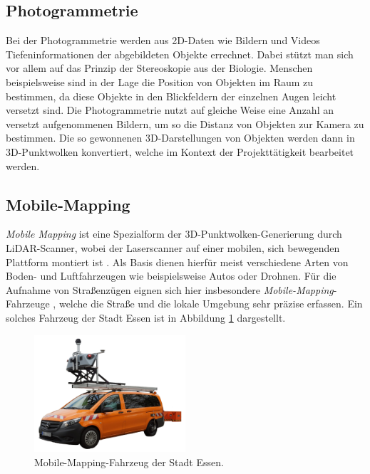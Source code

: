 \subsection*{Photogrammetrie}
Bei der Photogrammetrie \citep{Linder-2009, Remondino.ElHakim-2006} werden aus 2D-Daten wie Bildern und Videos Tiefeninformationen der abgebildeten Objekte errechnet. Dabei stützt man sich vor allem auf das Prinzip der Stereoskopie aus der Biologie. Menschen beispielsweise sind in der Lage die Position von Objekten im Raum zu bestimmen, da diese Objekte in den Blickfeldern der einzelnen Augen leicht versetzt sind. Die Photogrammetrie nutzt auf gleiche Weise eine Anzahl an versetzt aufgenommenen Bildern, um so die Distanz von Objekten zur Kamera zu bestimmen. Die so gewonnenen 3D-Darstellungen von Objekten werden dann in 3D-Punktwolken konvertiert, welche im Kontext der Projekttätigkeit bearbeitet werden.

\subsection*{Mobile-Mapping}
\textit{Mobile Mapping} ist eine Spezialform der 3D-Punktwolken-Generierung durch LiDAR-Scanner, wobei der Laserscanner auf einer mobilen, sich bewegenden Plattform montiert ist \citep{Puente.etal-2013}. Als Basis dienen hierfür meist verschiedene Arten von Boden- und Luftfahrzeugen wie beispielsweise Autos oder Drohnen. Für die Aufnahme von Straßenzügen eignen sich hier insbesondere \textit{Mobile-Mapping}-Fahrzeuge \citep{Ellum.ElSheimy-2002}, welche die Straße und die lokale Umgebung sehr präzise erfassen. Ein solches Fahrzeug der Stadt Essen ist in Abbildung \ref{fig:mm_vehicle} dargestellt.

\begin{figure}[!ht]
  \centering
  \includegraphics[width=0.5\textwidth]{graphics/mm_vehicle}
  \caption{Mobile-Mapping-Fahrzeug der Stadt Essen.}
  \label{fig:mm_vehicle}
\end{figure}

